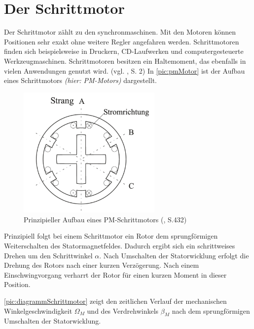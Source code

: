 \newpage
\section{Der Schrittmotor}
\label{sec:schrittmotor}
Der Schrittmotor zählt zu den \acrshort{synchronmaschine}n. Mit den Motoren können Positionen sehr exakt ohne weitere Regler angefahren werden. Schrittmotoren finden sich beispielsweise in Druckern, CD-Laufwerken und computergesteuerte Werkzeugmaschinen.  Schrittmotoren besitzen ein Haltemoment, das ebenfalls in vielen Anwendungen genutzt wird. (vgl. \cite{schrittmotorBa}, S. 2) In \autoref{pic:pmMotor} ist der Aufbau eines Schrittmotors \textit{(hier: PM-Motors)} dargestellt. 

\begin{figure}[h]
	\begin{center}
		\includegraphics[width=7cm]{pmMotor.png}
		\caption{Prinzipieller Aufbau eines PM-Schrittmotors (\cite{kleinantriebe}, S.432)}
		\label{pic:pmMotor}
	\end{center}
\end{figure}


Prinzipiell folgt bei einem Schrittmotor ein Rotor dem sprungförmigen Weiterschalten des Statormagnetfeldes. Dadurch ergibt sich ein schrittweises Drehen um den Schrittwinkel $\alpha$. Nach Umschalten der Statorwicklung erfolgt die Drehung des Rotors nach einer kurzen Verzögerung. Nach einem Einschwingvorgang verharrt der Rotor für einen kurzen Moment in dieser Position. \newpage

 \autoref{pic:diagrammSchrittmotor} zeigt den zeitlichen Verlauf der mechanischen Winkelgeschwindigkeit  $\Omega_M$ und des Verdrehwinkels $\beta_M$ nach dem sprungförmigen Umschalten der Statorwicklung.  


